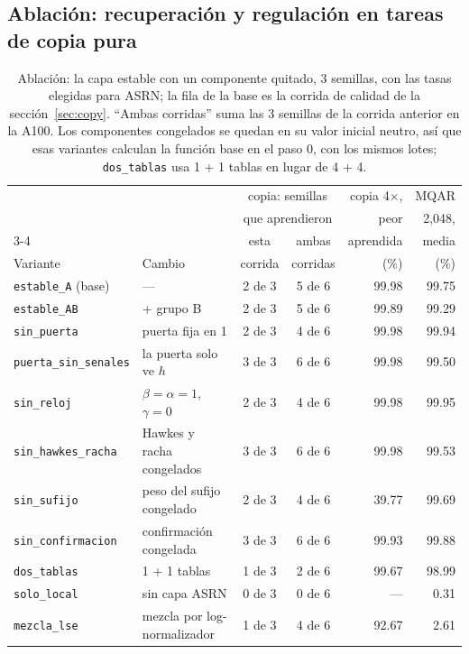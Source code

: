 \documentclass[11pt]{article}
\begin{document}
\subsection{Ablación: recuperación y regulación en tareas de copia pura}
\label{sec:ablation}

\begin{table}[t]
\centering\small
\begin{tabular}{llccrr}
\toprule
& & \multicolumn{2}{c}{copia: semillas} & copia 4$\times$, & MQAR\\
& & \multicolumn{2}{c}{que aprendieron} & peor & 2{,}048,\\
\cmidrule(lr){3-4}
& & esta & ambas & aprendida & media\\
Variante & Cambio & corrida & corridas & (\%) & (\%)\\
\midrule
\texttt{estable\_A} (base) & --- & 2 de 3 & 5 de 6 & 99.98 & 99.75\\
\texttt{estable\_AB} & + grupo B & 2 de 3 & 5 de 6 & 99.89 & 99.29\\
\texttt{sin\_puerta} & puerta fija en 1 & 2 de 3 & 4 de 6 & 99.98 & 99.94\\
\texttt{puerta\_sin\_senales} & la puerta solo ve $h$ & 3 de 3 & 6 de 6 & 99.98 & 99.50\\
\texttt{sin\_reloj} & $\beta=\alpha=1$, $\gamma=0$ & 2 de 3 & 4 de 6 & 99.98 & 99.95\\
\texttt{sin\_hawkes\_racha} & Hawkes y racha congelados & 3 de 3 & 6 de 6 & 99.98 & 99.53\\
\texttt{sin\_sufijo} & peso del sufijo congelado & 2 de 3 & 4 de 6 & 39.77 & 99.69\\
\texttt{sin\_confirmacion} & confirmación congelada & 3 de 3 & 6 de 6 & 99.93 & 99.88\\
\texttt{dos\_tablas} & 1 + 1 tablas & 1 de 3 & 2 de 6 & 99.67 & 98.99\\
\texttt{solo\_local} & sin capa ASRN & 0 de 3 & 0 de 6 & --- & 0.31\\
\texttt{mezcla\_lse} & mezcla por log-normalizador & 1 de 3 & 4 de 6 & 92.67 & 2.61\\
\bottomrule
\end{tabular}
\caption{Ablación: la capa estable con un componente quitado, 3 semillas, con las tasas elegidas para ASRN; la fila de
la base es la corrida de calidad de la sección~\ref{sec:copy}. ``Ambas corridas'' suma las 3 semillas de la corrida
anterior en la A100. Los componentes congelados se quedan en su valor inicial neutro, así que esas variantes calculan la
función base en el paso 0, con los mismos lotes; \texttt{dos\_tablas} usa 1 + 1 tablas en lugar de 4 + 4.}
\label{tab:ablation}
\end{table}
\end{document}
